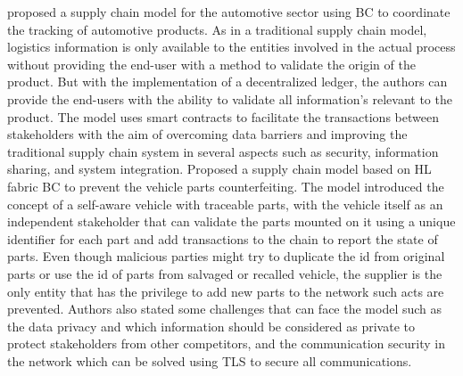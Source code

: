 \cite{Yahiaoui2020-gp}
proposed a supply chain model for the automotive sector using BC to coordinate the tracking of automotive products. As in a
traditional supply chain model, logistics information is only available to the entities involved in the actual process without providing the
end-user with a method to validate the origin of the product. But with the implementation of a decentralized ledger, the authors can provide
the end-users with the ability to validate all information's relevant to the product. The model uses smart contracts to facilitate the
transactions between stakeholders with the aim of overcoming data barriers and improving the traditional supply chain system in several
aspects such as security, information sharing, and system integration. \cite{Lu2019-wk} Proposed a supply chain model based on
HL fabric BC to prevent the vehicle parts counterfeiting. The model introduced the concept of a self-aware vehicle with traceable parts,
with the vehicle itself as an independent stakeholder that can validate the parts mounted on it using a unique identifier for each part and
add transactions to the chain to report the state of parts. Even though malicious parties might try to duplicate the id from original parts
or use the id of parts from salvaged or recalled vehicle, the supplier is the only entity that has the privilege to add new parts to the
network such acts are prevented. Authors also stated some challenges that can face the model such as the data privacy and which information
should be considered as private to protect stakeholders from other competitors, and the communication security in the network which can be
solved using TLS to secure all communications.


